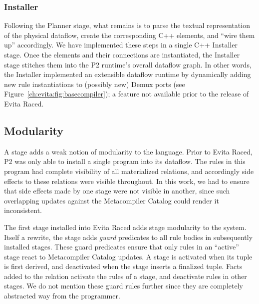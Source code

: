 \subsubsection{Installer}
\label{ch:evita:sec:installer}

Following the Planner stage, what remains is to parse the textual
representation of the physical dataflow, create the corresponding C++ elements,
and ``wire them up'' accordingly.  We have implemented these steps in a single
C++ Installer stage.  Once the elements and their connections are instantiated,
the Installer stage stitches them into the P2 runtime's overall dataflow graph.
In other words, the Installer implemented an extensible dataflow runtime by
dynamically adding new rule instantiations to (possibly new) Demux ports (see
Figure~\ref{ch:evita:fig:basecompiler}); a feature not available prior to the
release of Evita Raced.

% 



\subsection{Modularity}
\label{ch:evita:sec:modularity}

A stage adds a weak notion of modularity to the \OVERLOG language.  Prior to
Evita Raced, P2 was only able to install a single \OVERLOG program into its
dataflow.  The rules in this program had complete visibility of all
materialized relations, and accordingly side effects to these relations were
visible throughout.  In this work, we had to ensure that side effects made by
one stage were not visible in another, since such overlapping updates against
the Metacompiler Catalog could render it inconsistent.

The first \OVERLOG stage installed into Evita Raced adds stage modularity to
the system.  Itself a rewrite, the stage adds {\em guard} predicates to all
rule bodies in subsequently installed \OVERLOG stages.  These guard predicates
ensure that only rules in an ``active'' stage react to Metacompiler Catalog
updates.  A stage is activated when its  tuple is
first derived, and deactivated when the stage inserts a finalized 
tuple.  Facts added to the  relation activate the rules of a stage,
and deactivate rules in other stages.  We do not mention these guard rules
further since they are completely abstracted way from the programmer.

